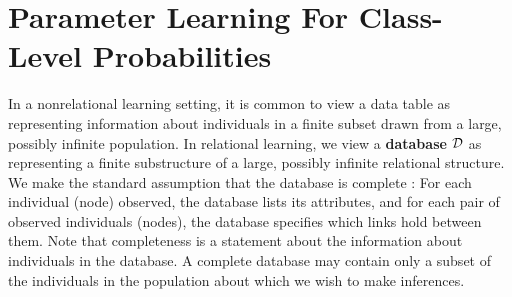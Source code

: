 \documentclass[oribibl]{llncs}
\begin{document}
%

\section{Parameter Learning For Class-Level Probabilities} \label{sec:learning}

In a nonrelational learning setting, it is common to view a data table as representing information about individuals in a finite subset drawn from a large, possibly infinite population. In relational learning, we view a \textbf{database} $\mathcal{D}$ as representing a finite substructure of a large, possibly infinite relational structure. 
We make the standard assumption that the database is complete \cite{Domingos2009,Khot2011}: For each individual (node) observed, the database lists its attributes, and for each pair of observed individuals (nodes), the database specifies which links hold between them. Note that completeness is a statement about the information about individuals in the database. A complete database may contain only a subset of the individuals in the population about which we wish to make inferences. %

\end{document}
